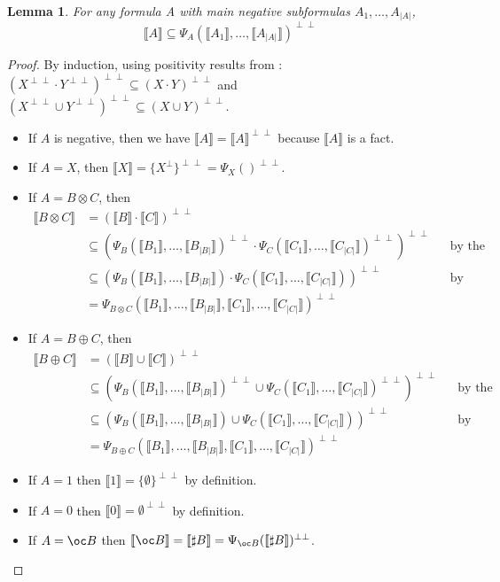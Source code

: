 \documentclass[11pt]{article}
\newtheorem{lemma}[theorem]{Lemma}
\newcommand\0{\textbf{0}}
\newcommand\1{\textbf{1}}
\newcommand\size[1]{{\lvert #1 \rvert}}
\newcommand\sem[1]{{\llbracket #1 \rrbracket}}
\newcommand\biperp{{\perp\perp}}
\begin{document}
\begin{lemma}
    \label{positivity}
    For any formula A with main negative subformulas $A_1, \dots, A_\size{A}$,
    $$\sem{A} \subseteq \Psi_A(\sem{A_1}, \dots, \sem{A_\size{A}})^\biperp$$
\end{lemma}
\begin{proof}
    By induction, using positivity results from \cite[appendix F]{meaning}:
    $(X^\biperp \cdot Y^\biperp)^\biperp \subseteq (X \cdot Y)^\biperp$
    and $(X^\biperp \cup Y^\biperp)^\biperp \subseteq (X \cup Y)^\biperp$.
    \begin{itemize}
        \item If $A$ is negative, then we have $\sem{A} = \sem{A}^\biperp$ because $\sem{A}$ is a fact.
        \item If $A = X$, then $\sem{X} = \{X^\perp\}^\biperp = \Psi_X()^\biperp$.
        \item If $A = B \otimes C$, then \begin{align*}
            \sem{B \otimes C}
            &= (\sem{B} \cdot \sem{C})^\biperp \\
            &\subseteq (\Psi_B(\sem{B_1}, \dots, \sem{B_\size{B}})^\biperp \cdot \Psi_C(\sem{C_1}, \dots, \sem{C_\size{C}})^\biperp)^\biperp &&\text{by the induction hypothesis} \\
            &\subseteq (\Psi_B(\sem{B_1}, \dots, \sem{B_\size{B}}) \cdot \Psi_C(\sem{C_1}, \dots, \sem{C_\size{C}}))^\biperp &&\text{by positivity} \\
            &= \Psi_{B \otimes C}(\sem{B_1}, \dots, \sem{B_\size{B}}, \sem{C_1}, \dots, \sem{C_\size{C}})^\biperp
        \end{align*}
        \item If $A = B \oplus C$, then \begin{align*}
            \sem{B \oplus C}
            &= (\sem{B} \cup \sem{C})^\biperp \\
            &\subseteq (\Psi_B(\sem{B_1}, \dots, \sem{B_\size{B}})^\biperp \cup \Psi_C(\sem{C_1}, \dots, \sem{C_\size{C}})^\biperp)^\biperp &&\text{by the induction hypothesis} \\
            &\subseteq (\Psi_B(\sem{B_1}, \dots, \sem{B_\size{B}}) \cup \Psi_C(\sem{C_1}, \dots, \sem{C_\size{C}}))^\biperp &&\text{by positivity} \\
            &= \Psi_{B \oplus C}(\sem{B_1}, \dots, \sem{B_\size{B}}, \sem{C_1}, \dots, \sem{C_\size{C}})^\biperp
        \end{align*}
        \item If $A = 1$ then $\sem{1} = \{\emptyset\}^\biperp$ by definition.
        \item If $A = 0$ then $\sem{0} = \emptyset^\biperp$ by definition.
        \item If $A = \oc B$ then $\sem{\oc B} = \sem{\sharp B} = \Psi_{\oc B}(\sem{\sharp B})^\biperp$.
    \end{itemize}
\end{proof}
\end{document}
